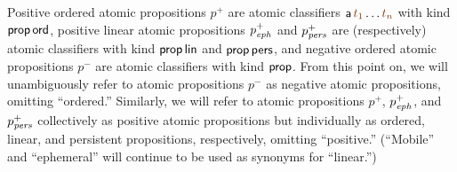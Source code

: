 Positive ordered atomic propositions
$p^+$ are atomic classifiers ${\sf a}\,\lf{t_1}\ldots\lf{t_n}$ with
kind ${\sf prop}\,{\sf ord}$, positive linear atomic propositions
$p^+_{\it eph}$ and $p^+_{\it pers}$ are (respectively) atomic classifiers
with kind ${\sf prop}\,{\sf lin}$ and ${\sf prop}\,{\sf pers}$, and
negative ordered atomic propositions $p^-$ are atomic classifiers
with kind ${\sf prop}$.  From this point on,
we will unambiguously refer to atomic propositions $p^-$ as negative
atomic propositions, omitting ``ordered.'' Similarly, we will refer to
atomic propositions $p^+$, $p^+_{\it eph}$, and $p^+_{\it pers}$ collectively
as positive atomic propositions but individually as ordered, linear,
and persistent propositions, respectively, omitting ``positive.''
(``Mobile'' and ``ephemeral'' will continue to be used as synonyms for
``linear.'')


